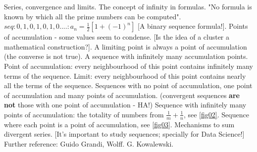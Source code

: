 \documentclass{cornell}
\begin{document}
%
{Series, convergence and limits. The concept of infinity in formulas. "No formula is known by which all the prime numbers can be computed". \( seq: 0,1,0,1,0,1,0.... : a_n = \frac{1}{2}[1+(-1)^n] \) [A binary sequence formula!]. Points of accumulation - some values seem to condense. [Is the idea of a cluster a mathematical construction?]. A limiting point is always a point of accumulation (the converse is not true). A sequence with infinitely many accumulation points. Point of accumulation: every neighbourhood of this point contains infinitely many terms of the sequence. Limit: every neighbourhood of this point contains nearly all the terms of the sequence. Sequences with no point of accumulation, one point of accumulation and many points of accumulation. (convergent sequences \textbf{are not} those with one point of accumulation - HA!) Sequence with infinitely many points of accumulation: the totality of numbers from \( \frac{1}{m}+\frac{1}{n} \), see \ref{fig02}. Sequence where each point is a point of accumulation, see \ref{fig03}. Mechanisms to sum divergent series. [It's important to study sequences; specially for Data Science!]}%
{Further reference: Guido Grandi, Wolff. G. Kowalewski. }%
\end{document}
